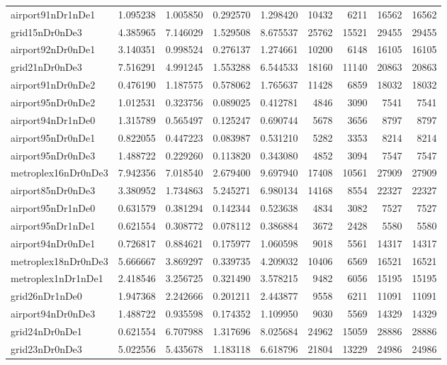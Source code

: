 \begin{longtable}{|l|r|r|r|r|r|r|r|r|}
airport91nDr1nDe1 & 1.095238 & 1.005850 & 0.292570 & 1.298420 & 10432 & 6211 & 16562 & 16562 \\
grid15nDr0nDe3 & 4.385965 & 7.146029 & 1.529508 & 8.675537 & 25762 & 15521 & 29455 & 29455 \\
airport92nDr0nDe1 & 3.140351 & 0.998524 & 0.276137 & 1.274661 & 10200 & 6148 & 16105 & 16105 \\
grid21nDr0nDe3 & 7.516291 & 4.991245 & 1.553288 & 6.544533 & 18160 & 11140 & 20863 & 20863 \\
airport91nDr0nDe2 & 0.476190 & 1.187575 & 0.578062 & 1.765637 & 11428 & 6859 & 18032 & 18032 \\
airport95nDr0nDe2 & 1.012531 & 0.323756 & 0.089025 & 0.412781 & 4846 & 3090 & 7541 & 7541 \\
airport94nDr1nDe0 & 1.315789 & 0.565497 & 0.125247 & 0.690744 & 5678 & 3656 & 8797 & 8797 \\
airport95nDr0nDe1 & 0.822055 & 0.447223 & 0.083987 & 0.531210 & 5282 & 3353 & 8214 & 8214 \\
airport95nDr0nDe3 & 1.488722 & 0.229260 & 0.113820 & 0.343080 & 4852 & 3094 & 7547 & 7547 \\
metroplex16nDr0nDe3 & 7.942356 & 7.018540 & 2.679400 & 9.697940 & 17408 & 10561 & 27909 & 27909 \\
airport85nDr0nDe3 & 3.380952 & 1.734863 & 5.245271 & 6.980134 & 14168 & 8554 & 22327 & 22327 \\
airport95nDr1nDe0 & 0.631579 & 0.381294 & 0.142344 & 0.523638 & 4834 & 3082 & 7527 & 7527 \\
airport95nDr1nDe1 & 0.621554 & 0.308772 & 0.078112 & 0.386884 & 3672 & 2428 & 5580 & 5580 \\
airport94nDr0nDe1 & 0.726817 & 0.884621 & 0.175977 & 1.060598 & 9018 & 5561 & 14317 & 14317 \\
metroplex18nDr0nDe3 & 5.666667 & 3.869297 & 0.339735 & 4.209032 & 10406 & 6569 & 16521 & 16521 \\
metroplex1nDr1nDe1 & 2.418546 & 3.256725 & 0.321490 & 3.578215 & 9482 & 6056 & 15195 & 15195 \\
grid26nDr1nDe0 & 1.947368 & 2.242666 & 0.201211 & 2.443877 & 9558 & 6211 & 11091 & 11091 \\
airport94nDr0nDe3 & 1.488722 & 0.935598 & 0.174352 & 1.109950 & 9030 & 5569 & 14329 & 14329 \\
grid24nDr0nDe1 & 0.621554 & 6.707988 & 1.317696 & 8.025684 & 24962 & 15059 & 28886 & 28886 \\
grid23nDr0nDe3 & 5.022556 & 5.435678 & 1.183118 & 6.618796 & 21804 & 13229 & 24986 & 24986 \\

\end{longtable}
